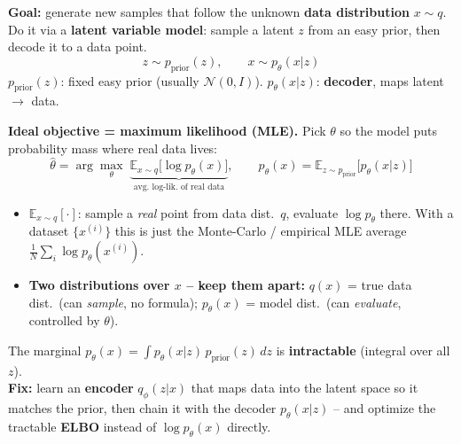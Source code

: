 \documentclass[10pt,a4paper]{article}
\begin{document}
	\begin{definitionbox}
		\textbf{Goal:} generate new samples that follow the unknown \textbf{data distribution} $x\sim q$. Do it via a \textbf{latent variable model}: sample a latent $z$ from an easy prior, then decode it to a data point.
		\[
		z \sim p_{\text{prior}}(z), \qquad x \sim p_\theta(x|z)
		\]
		$p_{\text{prior}}(z)$: fixed easy prior (usually $\mathcal{N}(0,I)$). \quad $p_\theta(x|z)$: \textbf{decoder}, maps latent $\to$ data.
	\end{definitionbox}

	\begin{formulabox}
		\textbf{Ideal objective = maximum likelihood (MLE).} Pick $\theta$ so the model puts probability mass where real data lives:
		\[
		\hat\theta = \arg\max_\theta\;
		\underbrace{\mathbb{E}_{x\sim q}\big[\log p_\theta(x)\big]}_{\text{avg.\ log-lik.\ of real data}},
		\qquad
		p_\theta(x) = \mathbb{E}_{z\sim p_{\text{prior}}}\big[p_\theta(x|z)\big]
		\]
	\end{formulabox}
	\begin{itemize}[leftmargin=*]
		\item $\mathbb{E}_{x\sim q}[\cdot]$: sample a \emph{real} point from data dist.\ $q$, evaluate $\log p_\theta$ there. With a dataset $\{x^{(i)}\}$ this is just the Monte-Carlo / empirical MLE average $\tfrac{1}{N}\sum_i \log p_\theta(x^{(i)})$.
		\item \textbf{Two distributions over $x$ -- keep them apart:} \;$q(x)$ = true data dist.\ (can \emph{sample}, no formula); \;$p_\theta(x)$ = model dist.\ (can \emph{evaluate}, controlled by $\theta$).
	\end{itemize}

	\begin{importantbox}
		The marginal $p_\theta(x)=\int p_\theta(x|z)\,p_{\text{prior}}(z)\,dz$ is \textbf{intractable} (integral over all $z$). \\
		\textbf{Fix:} learn an \textbf{encoder} $q_\phi(z|x)$ that maps data into the latent space so it matches the prior, then chain it with the decoder $p_\theta(x|z)$ -- and optimize the tractable \textbf{ELBO} instead of $\log p_\theta(x)$ directly.
	\end{importantbox}
\end{document}
